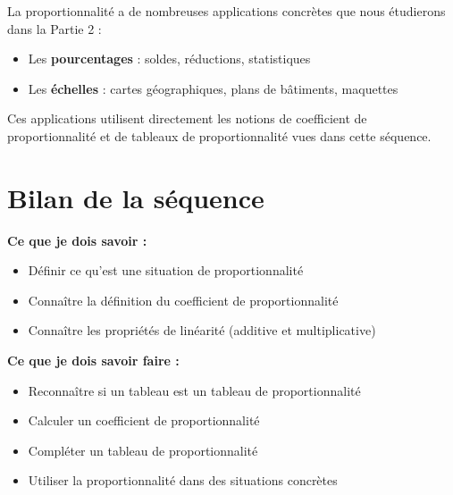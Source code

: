 \begin{remarkbox}
	La proportionnalité a de nombreuses applications concrètes que nous étudierons dans la Partie 2 :
	\begin{itemize}
		\item Les \textbf{pourcentages} : soldes, réductions, statistiques
		\item Les \textbf{échelles} : cartes géographiques, plans de bâtiments, maquettes
	\end{itemize}
	Ces applications utilisent directement les notions de coefficient de proportionnalité et de tableaux de proportionnalité vues dans cette séquence.
\end{remarkbox}

\section{Bilan de la séquence}

\begin{bilanbox}
	\textbf{Ce que je dois savoir :}
	\begin{itemize}
		\item[$\checkmark$] Définir ce qu'est une situation de proportionnalité
		\item[$\checkmark$] Connaître la définition du coefficient de proportionnalité
		\item[$\checkmark$] Connaître les propriétés de linéarité (additive et multiplicative)
	\end{itemize}

	\textbf{Ce que je dois savoir faire :}
	\begin{itemize}
		\item[$\checkmark$] Reconnaître si un tableau est un tableau de proportionnalité
		\item[$\checkmark$] Calculer un coefficient de proportionnalité
		\item[$\checkmark$] Compléter un tableau de proportionnalité
		\item[$\checkmark$] Utiliser la proportionnalité dans des situations concrètes
	\end{itemize}
\end{bilanbox}

